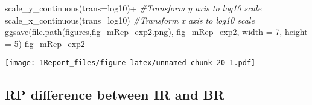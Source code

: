 \documentclass[
]{article}
\newenvironment{Shaded}{\begin{snugshade}}{\end{snugshade}}
\newcommand{\AttributeTok}[1]{\textcolor[rgb]{0.77,0.63,0.00}{#1}}
\newcommand{\CommentTok}[1]{\textcolor[rgb]{0.56,0.35,0.01}{\textit{#1}}}
\newcommand{\DecValTok}[1]{\textcolor[rgb]{0.00,0.00,0.81}{#1}}
\newcommand{\FunctionTok}[1]{\textcolor[rgb]{0.00,0.00,0.00}{#1}}
\newcommand{\NormalTok}[1]{#1}
\newcommand{\SpecialCharTok}[1]{\textcolor[rgb]{0.00,0.00,0.00}{#1}}
\newcommand{\StringTok}[1]{\textcolor[rgb]{0.31,0.60,0.02}{#1}}
\begin{document}
\begin{Shaded}
\begin{Highlighting}[]
  \FunctionTok{scale\_y\_continuous}\NormalTok{(}\AttributeTok{trans=}\StringTok{\textquotesingle{}log10\textquotesingle{}}\NormalTok{)}\SpecialCharTok{+} \CommentTok{\#Transform y axis to log10 scale}
  \FunctionTok{scale\_x\_continuous}\NormalTok{(}\AttributeTok{trans=}\StringTok{\textquotesingle{}log10\textquotesingle{}}\NormalTok{) }\CommentTok{\#Transform x axis to log10 scale}
\FunctionTok{ggsave}\NormalTok{(}\FunctionTok{file.path}\NormalTok{(}\StringTok{\textquotesingle{}figures\textquotesingle{}}\NormalTok{,}\StringTok{\textquotesingle{}fig\_mRep\_exp2.png\textquotesingle{}}\NormalTok{), fig\_mRep\_exp2, }\AttributeTok{width =} \DecValTok{7}\NormalTok{, }\AttributeTok{height =} \DecValTok{5}\NormalTok{)}
\NormalTok{fig\_mRep\_exp2}
\end{Highlighting}
\end{Shaded}

\texttt{[image: 1Report\_files/figure-latex/unnamed-chunk-20-1.pdf]}

\hypertarget{rp-difference-between-ir-and-br}{%
\subsection{RP difference between IR and
BR}\label{rp-difference-between-ir-and-br}}
\end{document}
